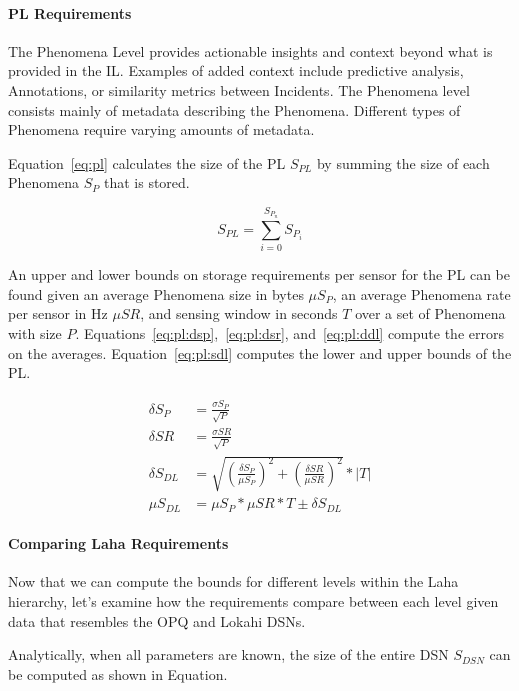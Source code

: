 \paragraph{PL Requirements}
The Phenomena Level provides actionable insights and context beyond what is provided in the IL. Examples of added context include predictive analysis, Annotations, or similarity metrics between Incidents. The Phenomena level consists mainly of metadata describing the Phenomena. Different types of Phenomena require varying amounts of metadata.

Equation~\ref{eq:pl} calculates the size of the PL $S_{PL}$ by summing the size of each Phenomena $S_{P}$ that is stored.

\begin{equation}\label{eq:pl}
	S_{PL} = \sum_{i=0}^{S_{P_{n}}} S_{P_{i}}
\end{equation}

An upper and lower bounds on storage requirements per sensor for the PL can be found given an average Phenomena size in bytes $\mu S_{P}$, an average Phenomena rate per sensor in Hz $\mu SR$, and sensing window in seconds $T$ over a set of Phenomena with size $P$. Equations~\ref{eq:pl:dsp},~\ref{eq:pl:dsr}, and~\ref{eq:pl:ddl} compute the errors on the averages. Equation~\ref{eq:pl:sdl} computes the lower and upper bounds of the PL\@.

\begin{align}
	\delta S_{P} &= \frac{\sigma S_{P}}{\sqrt{P}} \label{eq:pl:dsp} \\
	\delta SR &= \frac{\sigma SR}{\sqrt{P}} \label{eq:pl:dsr} \\
	\delta S_{DL} &= \sqrt{(\frac{\delta S_{P}}{\mu S_{P}})^2 + (\frac{\delta SR}{\mu SR})^2} * |T| \label{eq:pl:ddl} \\
	\mu S_{DL} &= \mu S_{P} * \mu SR * T \pm \delta S_{DL} \label{eq:pl:sdl}
\end{align}


\paragraph{Comparing Laha Requirements}

Now that we can compute the bounds for different levels within the Laha hierarchy, let's examine how the requirements compare between each level given data that resembles the OPQ and Lokahi DSNs.

Analytically, when all parameters are known, the size of the entire DSN $S_{DSN}$ can be computed as shown in Equation.

